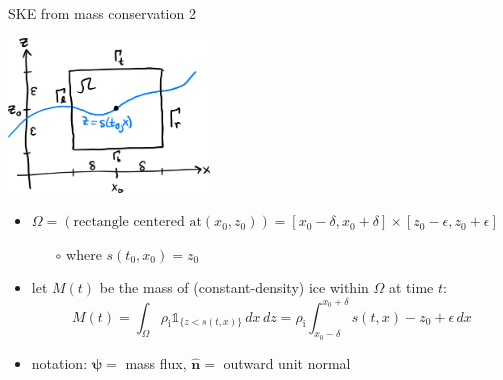 \documentclass[10pt,dvipsnames]{beamer}
\newcommand{\hbn}{\hat{\mathbf{n}}}
\newcommand{\bpsi}{\bm{\psi}}
\newcommand{\eps}{\epsilon}
\newcommand{\rhoi}{\rho_{\text{i}}}
\begin{document}
\begin{frame}{SKE from mass conservation 2}
\begin{center}
\includegraphics[width=0.4\textwidth]{skederive.png}
\end{center}

\begin{itemize}
\item $\Omega = (\text{rectangle centered at} (x_0,z_0)) =[x_0-\delta,x_0+\delta] \times [z_0-\eps,z_0+\eps]$

    \begin{itemize}
    \item[$\circ$] where $s(t_0,x_0)=z_0$
    \end{itemize}
\item let $M(t)$ be the mass of (constant-density) ice within $\Omega$ at time $t$:
   $$M(t) = \int_\Omega \rhoi \mathbb{1}_{\{z<s(t,x)\}}\,dx\,dz = \rhoi \int_{x_0-\delta}^{x_0+\delta} s(t,x) - z_0 + \eps\,dx$$
\item notation: $\bpsi =$ mass flux, $\hbn =$ outward unit normal
\end{itemize}
\end{frame}
\end{document}
